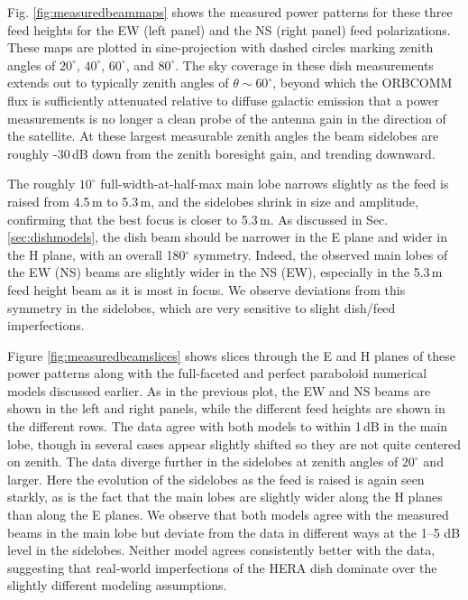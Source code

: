 Fig. \ref{fig:measuredbeammaps} shows the measured power patterns for these three feed heights for the EW (left panel) and the NS (right panel) feed polarizations. These maps are plotted in sine-projection with dashed circles marking zenith angles of $20^\circ$, $40^\circ$, $60^\circ$, and $80^\circ$. The sky coverage in these dish measurements extends out to typically zenith angles of $\theta\sim60^\circ$, beyond which the ORBCOMM flux is sufficiently attenuated relative to diffuse galactic emission that a power measurements is no longer a clean probe of the antenna gain in the direction of the satellite. At these largest measurable zenith angles the beam sidelobes are roughly -30\,dB down from the zenith boresight gain, and trending downward. 

The roughly $10^\circ$ full-width-at-half-max main lobe narrows slightly as the feed is raised from 4.5\,m to 5.3\,m, and the sidelobes shrink in size and amplitude, confirming that the best focus is closer to 5.3\,m. As discussed in Sec. \ref{sec:dishmodels}, the dish beam should be narrower in the E plane and wider in the H plane, with an overall 180$^\circ$ symmetry. Indeed, the observed main lobes of the EW (NS) beams are slightly wider in the NS (EW), especially in the 5.3\,m feed height beam as it is most in focus. We observe deviations from this symmetry in the sidelobes, which are very sensitive to slight dish/feed imperfections. 

Figure \ref{fig:measuredbeamslices} shows slices through the E and H planes of these power patterns along with the full-faceted and perfect paraboloid numerical models discussed earlier. As in the previous plot, the EW and NS beams are shown in the left and right panels, while the different feed heights are shown in the different rows. The data agree with both models to within 1\,dB in the main lobe, though in several cases appear slightly shifted so they are not quite centered on zenith. The data diverge further in the sidelobes at zenith angles of $20^\circ$ and larger. Here the evolution of the sidelobes as the feed is raised is again seen starkly, as is the fact that the main lobes are slightly wider along the H planes than along the E planes. We observe that both models agree with the measured beams in the main lobe but deviate from the data in different ways at the 1--5 dB level in the sidelobes. Neither model agrees consistently better with the data, suggesting that real-world imperfections of the HERA dish dominate over the slightly different modeling assumptions. 

